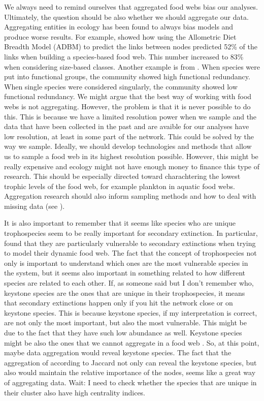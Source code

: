 	We always need to remind ourselves that aggregated food webs bias our analyses.
	Ultimately, the question should be also whether we should aggregate our data.
	Aggregating entities in ecology has been found to always bias models and produce worse results.
	For example, \citet{Woodward2010b} showed how using the Allometric Diet Breadth Model (ADBM) \citep{Petchey2008} to predict the links between nodes predicted 52\% of the links when building a species-based food web.
	This number increased to 83\% when considering size-based classes.
	Another example is from \citet{Petchey2002}.
	When species were put into functional groups, the community showed high functional redundancy.
	When single species were considered singularly, the community showed low functional redundancy.
	We might argue that the best way of working with food webs is not aggregating. However, the problem is that it is never possible to do this.
	This is because we have a limited resolution power when we sample and the data that have been collected in the past and are avaible for our analyses have low resolution, at least in some part of the network.
	This could be solved by the way we sample.
	Ideally, we should develop technologies and methods that allow us to sample a food web in its highest resolution possible.
	However, this might be really expensive and ecology might not have enough money to finance this type of research.
	This should be especially directed toward charachtering the lowest trophic levels of the food web, for example plankton in aquatic food webs.
	Aggregation research should also inform sampling methods and how to deal with missing data (see \citet{Patonai2017}).

	It is also important to remember that it seems like species who are unique trophospecies seem to be really important for secondary extinction. In particular, \citep{Petchey2008a} found that they are particularly vulnerable to secondary extinctions when trying to model their dynamic food web. The fact that the concept of trophospecies not only is important to understand which ones are the most vulnerable species in the system, but it seems also important in something related to how different species are related to each other. If, as someone said but I don't remember who, keystone species are the ones that are unique in their trophospecies, it means that secondary extinctions happen only if you hit the network close or on keystone species. This is because keystone species, if my interpretation is correct, are not only the most important, but also the most vulnerable. This might be due to the fact that they have such low abundance as well.
	Keystone species might be also the ones that we cannot aggregate in a food web \citep{Bond1994}. So, at this point, maybe data aggregation would reveal keystone species. The fact that the aggregation of according to Jaccard not only can reveal the keystone species, but also would maintain the relative importance of the nodes, seems like a great way of aggregating data. Wait: I need to check whether the species that are unique in their cluster also have high centrality indices.
